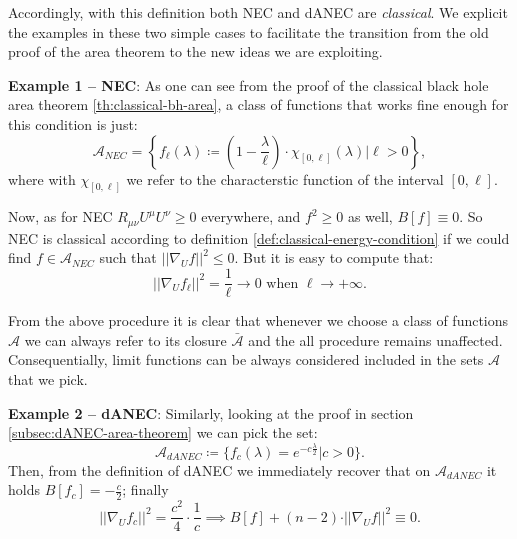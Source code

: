 	Accordingly, with this definition both NEC and dANEC are \emph{classical}. We explicit the examples in these two simple cases to facilitate the transition from the old proof of the area theorem to the new ideas we are exploiting.

	\textbf{Example 1 -- NEC}: As one can see from the proof of the classical black hole area theorem \ref{th:classical-bh-area}, a class of functions that works fine enough for this condition is just:
	\[
	\mathcal{A}_{NEC} = \left\{ f_{\ell}(\lambda) \coloneqq \left(1 - \frac{\lambda}{\ell}\right) \cdot \chi_{[0, \ell]}(\lambda) \vert \ell > 0 \right\},
	\]
	where with \(\chi_{[0, \ell]}\) we refer to the characterstic function of the interval \([0,\ell]\).

	Now, as for NEC \(R_{\mu\nu}U^{\mu}U^{\nu} \ge 0\) everywhere, and \(f^2 \ge 0\) as well, \(B[f] \equiv 0\). So NEC is classical according to definition \ref{def:classical-energy-condition} if we could find \(f \in \mathcal{A}_{NEC}\) such that \(\vert\vert \nabla_U f \vert\vert^2 \le 0\). But it is easy to compute that:
	\[
		\vert\vert \nabla_U f_{\ell} \vert\vert^2 = \frac{1}{\ell} \longrightarrow 0 \text{ when } \ell \rightarrow +\infty.
	\]
	\begin{remark}
		From the above procedure it is clear that whenever we choose a class of functions \(\mathcal{A}\) we can always refer to its closure \(\bar{\mathcal{A}}\) and the all procedure remains unaffected. Consequentially, limit functions can be always considered included in the sets \(\mathcal{A}\) that we pick.
	\end{remark}

	\textbf{Example 2 -- dANEC}: Similarly, looking at the proof in section \ref{subsec:dANEC-area-theorem} we can pick the set:
	\[
	\mathcal{A}_{dANEC} \coloneqq \{ f_c(\lambda) = e^{-c\frac{\lambda}{2}} \vert c >0\}.	
	\]
	Then, from the definition of dANEC we immediately recover that on \(\mathcal{A}_{dANEC}\) it holds \(B[f_c] = -\frac{c}{2}\); finally 
	\[
		\vert\vert \nabla_U f_{c} \vert\vert^2 = \frac{c^2}{4} \cdot \frac{1}{c} \implies B[f] + (n - 2) \cdot \vert\vert \nabla_U f \vert\vert^2 \equiv 0.
	\]


